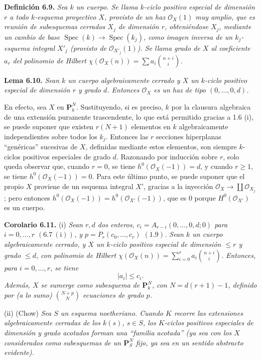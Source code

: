 \textbf{Definición 6.9.} \emph{Sea $k$ un cuerpo. Se llama \emph{$k$-ciclo positivo especial de dimensión $r$} a todo $k$-esquema proyectivo $X$, provisto de un haz $\mathcal O_X(1)$ muy amplio, que es reunión de subesquemas cerrados $X_j$ de dimensión $r$, obteniéndose $X_j$, mediante un cambio de base $\operatorname{Spec}(k)\to\operatorname{Spec}(k_j)$, como imagen inversa de un $k_j$-esquema integral $X'_j$ (provisto de $\mathcal O_{X'_j}(1)$). Se llama \emph{grado} de $X$ al coeficiente $a_r$ del polinomio de Hilbert $\chi(\mathcal O_X(n))=\sum a_i\binom{n+i}{i}$.}

\textbf{Lema 6.10.} \emph{Sean $k$ un cuerpo algebraicamente cerrado y $X$ un $k$-ciclo positivo especial de dimensión $r$ y grado $d$. Entonces $\mathcal O_X$ es un haz de tipo $(0,\ldots,0,d)$.}

En efecto, sea $X$ en $\mathbf P^N_k$. Sustituyendo, si es preciso, $k$ por la clausura algebraica de una extensión puramente trascendente, lo que está permitido gracias a 1.6 (i), se puede suponer que existen $r(N+1)$ elementos en $k$ algebraicamente independientes sobre todos los $k_j$. Entonces las $r$ secciones hiperplanas ``genéricas'' sucesivas de $X$, definidas mediante estos elementos, son siempre $k$-ciclos positivos especiales de grado $d$. Razonando por inducción sobre $r$, solo queda observar que, cuando $r=0$, se tiene $h^0(\mathcal O_X(-1))=d$, y cuando $r\ge1$, se tiene $h^0(\mathcal O_X(-1))=0$. Para este último punto, se puede suponer que el propio $X$ proviene de un esquema integral $X'$, gracias a la inyección $\mathcal O_X\to \coprod\mathcal O_{X_j}$; pero entonces $h^0(\mathcal O_X(-1))=h^0(\mathcal O_{X'}(-1))$, que es $0$ porque $H^0(\mathcal O_{X'})$ es un cuerpo.

\textbf{Corolario 6.11.} (i) \emph{Sean $r,d$ dos enteros, $c_i=A_{r-i}(0,\ldots,0,d;0)$ para $i=0,\ldots,r$ $(6.7\ \mathrm{(i)})$, y $p=P_r(c_0,\ldots,c_r)$ $(1.9)$. Sean $k$ un cuerpo algebraicamente cerrado, y $X$ un $k$-ciclo positivo especial de dimensión $\le r$ y grado $\le d$, con polinomio de Hilbert $\chi(\mathcal O_X(n))=\sum_{i=0}^{r}a_i\binom{n+i}{i}$. Entonces, para $i=0,\ldots,r$, se tiene}
\[
   |a_i|\le c_i.
\]
\emph{Además, $X$ se sumerge como subesquema de $\mathbf P^N_k$, con $N=d(r+1)-1$, definido por (a lo sumo) $\binom{N+p}{N}$ ecuaciones de grado $p$.}

(ii) (Chow) \emph{Sea $S$ un esquema noetheriano. Cuando $K$ recorre las extensiones algebraicamente cerradas de los $k(s)$, $s\in S$, los $K$-ciclos positivos especiales de dimensión y grado acotados forman una ``familia acotada'' (ya sea con los $X$ considerados como subesquemas de un $\mathbf P^N_S$ fijo, ya sea en un sentido abstracto evidente).}

